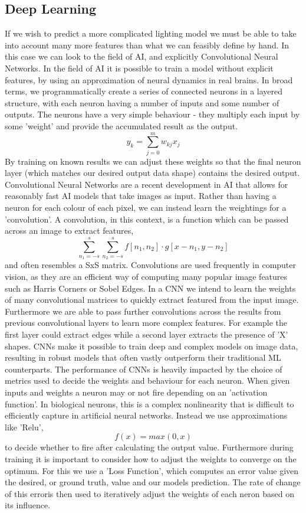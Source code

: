 \documentclass[ %
                    author={Gavin Parker},
                supervisor={Dr. Neill Campbell},
                    degree={MEng},
                     title={Deep Siamese Networks for Illumination Estimation from Stereo Images},
                  subtitle={},
                      type={research},
                      year={2018} ]{dissertation}
\begin{document}
\subsection{Deep Learning}
If we wish to predict a more complicated lighting model we must be able to take into account many more features than what we can feasibly define by hand. In this case we can look to the field of AI, and explicitly Convolutional Neural Networks. In the field of AI it is possible to train a model without explicit features, by using an approximation of neural dynamics in real brains. In broad terms, we programmatically create a series of connected neurons in a layered structure, with each neuron having a number of inputs and some number of outputs. The neurons have a very simple behaviour - they multiply each input by some 'weight' and provide the accumulated result as the output.
\[y_k = \sum_{j=0}^{m}{w_{kj}x_j}\]
By training on known results we can adjust these weights so that the final neuron layer (which matches our desired output data shape) contains the desired output.
\newline
Convolutional Neural Networks are a recent development in AI that allows for reasonably fast AI models that take images as input. Rather than having a neuron for each colour of each pixel, we can instead learn the weightings for a 'convolution'. A convolution, in this context, is a function which can be passed across an image to extract features,
\[\sum_{n_1=-s}^{s}{\sum_{n_2=-s}^{s}{f[n_1, n_2]\cdot g[x-n_1,y-n_2]}} \]
and often resembles a SxS matrix. Convolutions are used frequently in computer vision, as they are an efficient way of computing many popular image features such as Harris Corners or Sobel Edges. In a CNN we intend to learn the weights of many convolutional matrices to quickly extract featured from the input image. Furthermore we are able to pass further convolutions across the results from previous convolutional layers to learn more complex features. For example the first layer could extract edges while a second layer extracts the presence of 'X' shapes. CNNs make it possible to train deep and complex models on image data, resulting in robust models that often vastly outperform their traditional ML counterparts.
\newline
The performance of CNNs is heavily impacted by the choice of metrics used to decide the weights and behaviour for each neuron. When given inputs and weights a neuron may or not fire depending on an 'activation function'. In biological neurons, this is a complex nonlinearity that is difficult to efficiently capture in artificial neural networks. Instead we use approximations like 'Relu',
\[f(x) = max(0,x)\]
to decide whether to fire after calculating the output value. Furthermore during training it is important to consider how to adjust the weights to converge on the optimum. For this we use a 'Loss Function', which computes an error value given the desired, or ground truth, value and our models prediction. The rate of change of this erroris then used to iteratively adjust the weights of each neron based on its influence.
\end{document}

